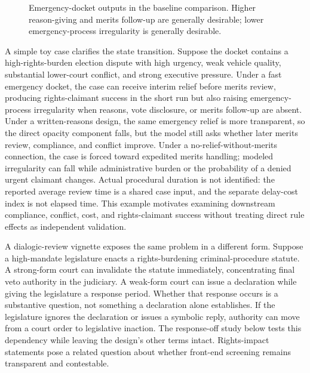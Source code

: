\documentclass[
  journal=small,
  manuscript=research-article,
  year=2026
]{cup-journal}
\begin{document}
\begin{figure}[hbt!]
\centering

\caption{Emergency-docket outputs in the baseline comparison. Higher reason-giving and merits follow-up are generally desirable; lower emergency-process irregularity is generally desirable.}
\label{fig:emergency-docket}
\end{figure}

A simple toy case clarifies the state transition. Suppose the docket contains a high-rights-burden election dispute with high urgency, weak vehicle quality, substantial lower-court conflict, and strong executive pressure. Under a fast emergency docket, the case can receive interim relief before merits review, producing rights-claimant success in the short run but also raising emergency-process irregularity when reasons, vote disclosure, or merits follow-up are absent. Under a written-reasons design, the same emergency relief is more transparent, so the direct opacity component falls, but the model still asks whether later merits review, compliance, and conflict improve. Under a no-relief-without-merits connection, the case is forced toward expedited merits handling; modeled irregularity can fall while administrative burden or the probability of a denied urgent claimant changes. Actual procedural duration is not identified: the reported average review time is a shared case input, and the separate delay-cost index is not elapsed time. This example motivates examining downstream compliance, conflict, cost, and rights-claimant success without treating direct rule effects as independent validation.

A dialogic-review vignette exposes the same problem in a different form. Suppose a high-mandate legislature enacts a rights-burdening criminal-procedure statute. A strong-form court can invalidate the statute immediately, concentrating final veto authority in the judiciary. A weak-form court can issue a declaration while giving the legislature a response period. Whether that response occurs is a substantive question, not something a declaration alone establishes. If the legislature ignores the declaration or issues a symbolic reply, authority can move from a court order to legislative inaction. The response-off study below tests this dependency while leaving the design's other terms intact. Rights-impact statements pose a related question about whether front-end screening remains transparent and contestable.
\end{document}
